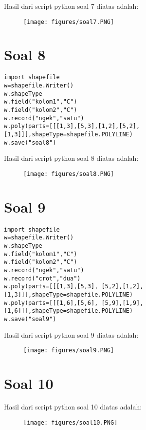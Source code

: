 \par Hasil dari script python soal 7 diatas adalah: 
\begin{figure}[!htbp]
    \centering
    \texttt{[image: figures/soal7.PNG]}
    \label{soal7}
\end{figure}

\section{Soal 8}
\begin{verbatim}
import shapefile
w=shapefile.Writer()
w.shapeType
w.field("kolom1","C")
w.field("kolom2","C")
w.record("ngek","satu")
w.poly(parts=[[[1,3],[5,3],[1,2],[5,2],
[1,3]]],shapeType=shapefile.POLYLINE)
w.save("soal8")
\end{verbatim}

\par Hasil dari script python soal 8 diatas adalah: 
\begin{figure}[!htbp]
    \centering
    \texttt{[image: figures/soal8.PNG]}
    \label{soal8}
\end{figure}

\section{Soal 9}
\begin{verbatim}
import shapefile
w=shapefile.Writer()
w.shapeType
w.field("kolom1","C")
w.field("kolom2","C")
w.record("ngek","satu")
w.record("crot","dua")
w.poly(parts=[[[1,3],[5,3], [5,2],[1,2],
[1,3]]],shapeType=shapefile.POLYLINE)
w.poly(parts=[[[1,6],[5,6], [5,9],[1,9],
[1,6]]],shapeType=shapefile.POLYLINE)
w.save("soal9")
\end{verbatim}

\par Hasil dari script python soal 9 diatas adalah: 
\begin{figure}[!htbp]
    \centering
    \texttt{[image: figures/soal9.PNG]}
    \label{soal9}
\end{figure}

\section{Soal 10}
\par Hasil dari script python soal 10 diatas adalah: 
\begin{figure}[!htbp]
    \centering
    \texttt{[image: figures/soal10.PNG]}
    \label{soal10}
\end{figure}





 